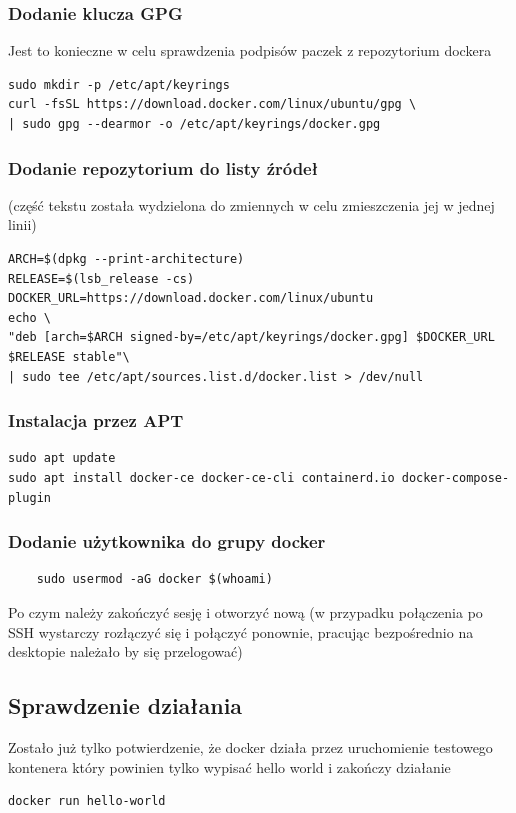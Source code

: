 \documentclass[../main.tex]{subfiles}
\begin{document}
\subsubsection{Dodanie klucza GPG}
Jest to konieczne w celu sprawdzenia podpisów paczek z repozytorium dockera
\begin{verbatim}
sudo mkdir -p /etc/apt/keyrings
curl -fsSL https://download.docker.com/linux/ubuntu/gpg \
| sudo gpg --dearmor -o /etc/apt/keyrings/docker.gpg
\end{verbatim}
\begin{samepage}
    
\subsubsection{Dodanie repozytorium do listy źródeł}
(część tekstu została wydzielona do zmiennych w celu zmieszczenia jej w jednej linii)
\begin{verbatim}
ARCH=$(dpkg --print-architecture)
RELEASE=$(lsb_release -cs)
DOCKER_URL=https://download.docker.com/linux/ubuntu
echo \
"deb [arch=$ARCH signed-by=/etc/apt/keyrings/docker.gpg] $DOCKER_URL $RELEASE stable"\
| sudo tee /etc/apt/sources.list.d/docker.list > /dev/null
\end{verbatim}
\end{samepage}

\subsubsection{Instalacja przez APT}
\begin{verbatim}
sudo apt update
sudo apt install docker-ce docker-ce-cli containerd.io docker-compose-plugin
\end{verbatim}

\subsubsection{Dodanie użytkownika do grupy docker}
\begin{verbatim}
    sudo usermod -aG docker $(whoami)
\end{verbatim}
Po czym należy zakończyć sesję i otworzyć nową (w przypadku połączenia po SSH wystarczy rozłączyć się i połączyć ponownie, pracując bezpośrednio na desktopie należało by się przelogować)

\subsection{Sprawdzenie działania}
Zostało już tylko potwierdzenie, że docker działa przez uruchomienie testowego kontenera który powinien tylko wypisać hello world i zakończy działanie
\begin{verbatim}
docker run hello-world
\end{verbatim}
\end{document}
